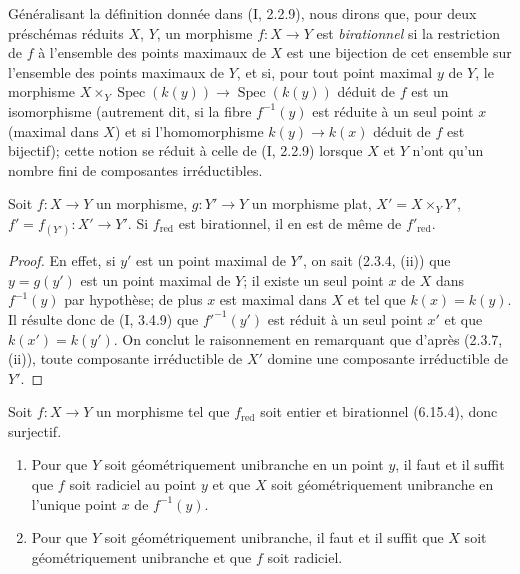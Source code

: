 \begin{env}[6.15.4]
\label{IV.2.s6.15.4-fr}
Généralisant la définition donnée dans (I, 2.2.9), nous dirons que, pour
deux préschémas réduits $X$, $Y$, un morphisme $f:X\to Y$ est
\emph{birationnel} si la restriction de $f$ à l'ensemble des points
maximaux de $X$ est une bijection de cet ensemble sur l'ensemble des points
maximaux de $Y$, et si, pour tout point maximal $y$ de $Y$, le morphisme
$X\times_Y\operatorname{Spec}(k(y))\to\operatorname{Spec}(k(y))$ déduit de
$f$ est un isomorphisme (autrement dit, si la fibre $f^{-1}(y)$ est réduite
à un seul point $x$ (maximal dans $X$) et si l'homomorphisme
$k(y)\to k(x)$ déduit de $f$ est bijectif); cette notion se réduit à celle
de (I, 2.2.9) lorsque $X$ et $Y$ n'ont qu'un nombre fini de composantes
irréductibles.
\end{env}

\begin{lemma}[6.15.4.1]
\label{IV.2.s6.15.4.1-fr}
Soit $f:X\to Y$ un morphisme, $g:Y'\to Y$ un morphisme plat,
$X'=X\times_Y Y'$, $f'=f_{(Y')}:X'\to Y'$. Si $f_{\mathrm{red}}$ est
birationnel, il en est de même de $f'_{\mathrm{red}}$.
\end{lemma}

\begin{proof}
En effet, si $y'$ est un point maximal de $Y'$, on sait (2.3.4, (ii)) que
$y=g(y')$ est un point maximal de $Y$; il existe un seul point $x$ de $X$
dans $f^{-1}(y)$ par hypothèse; de plus $x$ est maximal dans $X$ et tel que
$k(x)=k(y)$. Il résulte donc de (I, 3.4.9) que $f'^{-1}(y')$ est réduit à
un seul point $x'$ et que $k(x')=k(y')$. On conclut le raisonnement en
remarquant que d'après (2.3.7, (ii)), toute composante irréductible de $X'$
domine une composante irréductible de $Y'$.
\end{proof}

\begin{proposition}[6.15.5]
\label{IV.2.s6.15.5-fr}
Soit $f:X\to Y$ un morphisme tel que $f_{\mathrm{red}}$ soit entier et
birationnel (6.15.4), donc surjectif.
\begin{enumerate}
\item[(i)] Pour que $Y$ soit géométriquement unibranche en un point $y$,
il faut et il suffit que $f$ soit radiciel au point $y$ et que $X$ soit
géométriquement unibranche en l'unique point $x$ de $f^{-1}(y)$.
\item[(ii)] Pour que $Y$ soit géométriquement unibranche, il faut et il
suffit que $X$ soit géométriquement unibranche et que $f$ soit radiciel.
\end{enumerate}
\end{proposition}

